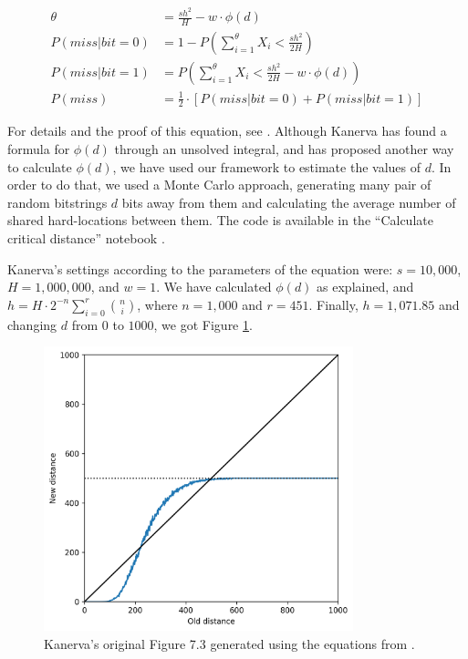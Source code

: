 \begin{align}
\theta &= \frac{sh^2}{H} - w \cdot \phi(d) \\
P(miss | bit=0) &= 1 - P \left( \sum_{i=1}^\theta X_i < \frac{sh^2}{2H} \right) \\
P(miss | bit=1) &= P \left( \sum_{i=1}^\theta X_i < \frac{sh^2}{2H} - w \cdot \phi(d) \right) \\
P(miss) &= \frac{1}{2} \cdot \left[ P(miss | bit=0) + P(miss | bit=1) \right]
\end{align}

For details and the proof of this equation, see \citet{brogliato2014sparse}. Although Kanerva has found a formula for $\phi(d)$ through an unsolved integral, and \citet{de1995geometrical} has proposed another way to calculate $\phi(d)$, we have used our framework to estimate the values of $d$. In order to do that, we used a Monte Carlo approach, generating many pair of random bitstrings $d$ bits away from them and calculating the average number of shared hard-locations between them. The code is available in the ``Calculate critical distance'' notebook \citep{sdmframework}.

Kanerva's settings according to the parameters of the equation were: $s=10,000$, $H=1,000,000$, and $w=1$. We have calculated $\phi(d)$ as explained, and $h = H \cdot 2^{-n} \sum_{i=0}^{r} \binom{n}{i}$, where $n=1,000$ and $r=451$. Finally, $h=1,071.85$ and changing $d$ from $0$ to $1000$, we got Figure \ref{fig:kanerva-figure-73-calculated}.

\begin{figure}[!htb]
\centering\includegraphics[width=0.8\textwidth]{./images02/calculated-table-72.png}
\caption{Kanerva's original Figure 7.3 generated using the equations from \citet{brogliato2014sparse}.
\label{fig:kanerva-figure-73-calculated}
}
\end{figure}

